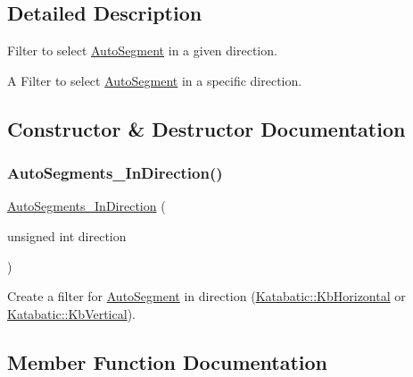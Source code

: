 \subsection{Detailed Description}
Filter to select \hyperlink{classKatabatic_1_1AutoSegment}{Auto\+Segment} in a given direction. 

A Filter to select \hyperlink{classKatabatic_1_1AutoSegment}{Auto\+Segment} in a specific direction. 

\subsection{Constructor \& Destructor Documentation}
\mbox{\label{classKatabatic_1_1AutoSegments__InDirection_ad51ecb756fa52e994c47dffcdb21c136}} 
\subsubsection{\texorpdfstring{Auto\+Segments\+\_\+\+In\+Direction()}{AutoSegments\_InDirection()}}
{\footnotesize\ttfamily \hyperlink{classKatabatic_1_1AutoSegments__InDirection}{Auto\+Segments\+\_\+\+In\+Direction} (\begin{DoxyParamCaption}\item[{unsigned int}]{direction }\end{DoxyParamCaption})\hspace{0.3cm}{\ttfamily [inline]}}

Create a filter for \hyperlink{classKatabatic_1_1AutoSegment}{Auto\+Segment} in {\ttfamily direction} (\hyperlink{namespaceKatabatic_a2af2ad6b6441614038caf59d04b3b217a1a9045673c5d3c30b067100f1440ae1b}{Katabatic\+::\+Kb\+Horizontal} or \hyperlink{namespaceKatabatic_a2af2ad6b6441614038caf59d04b3b217a284cad95203a27172838b09e396e3590}{Katabatic\+::\+Kb\+Vertical}). 

\subsection{Member Function Documentation}
\mbox{\label{classKatabatic_1_1AutoSegments__InDirection_a0a6021852a0c5681a7b53dce6b2b87a4}} 

